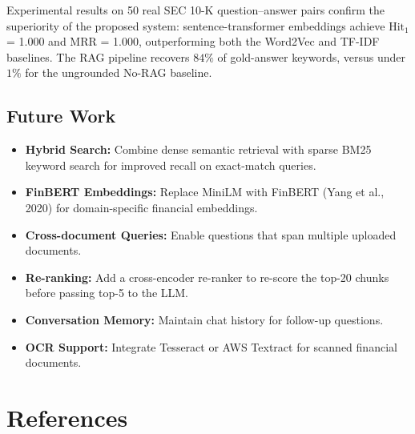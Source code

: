 \documentclass[12pt,a4paper]{article}
\begin{document}
Experimental results on 50 real SEC 10-K question--answer pairs confirm the superiority of the proposed system: sentence-transformer embeddings achieve $\text{Hit}_1$ = 1.000 and MRR = 1.000, outperforming both the Word2Vec and TF-IDF baselines. The RAG pipeline recovers $84\%$ of gold-answer keywords, versus under $1\%$ for the ungrounded No-RAG baseline.

\subsection{Future Work}

\begin{itemize}[leftmargin=*, noitemsep]
  \item \textbf{Hybrid Search:} Combine dense semantic retrieval with sparse BM25 keyword search for improved recall on exact-match queries.
  \item \textbf{FinBERT Embeddings:} Replace MiniLM with FinBERT (Yang et al., 2020) for domain-specific financial embeddings.
  \item \textbf{Cross-document Queries:} Enable questions that span multiple uploaded documents.
  \item \textbf{Re-ranking:} Add a cross-encoder re-ranker to re-score the top-20 chunks before passing top-5 to the LLM.
  \item \textbf{Conversation Memory:} Maintain chat history for follow-up questions.
  \item \textbf{OCR Support:} Integrate Tesseract or AWS Textract for scanned financial documents.
\end{itemize}

\newpage
\section*{References}
\end{document}
